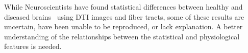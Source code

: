 


%
%
While Neuroscientists have found statistical differences 
between healthy and diseased brains~\cite{zhang2015diffusion,acosta2016whole, wen2016white} 
using DTI images and fiber tracts,
some of these results are uncertain, have been unable to be reproduced, or lack explanation. A better understanding of the relationships between the statistical and physiological features is needed.

